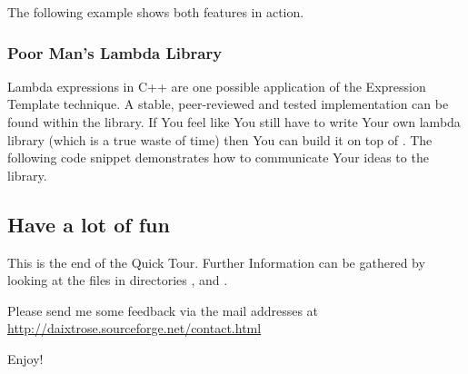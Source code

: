The following example shows both features in action.



\subsubsection{Poor Man's Lambda Library}

Lambda expressions in C++ are one possible application of the Expression
Template technique. A stable, peer-reviewed and tested implementation can be
found within the  library. If You feel like You still have to write
Your own lambda library (which is a true waste of time) then You can build it on
top of \Daixtrose. The following code snippet demonstrates how to communicate
Your ideas to the \Daixtrose library.








\subsection{Have a lot of fun}

This is the end of the Quick Tour.
Further Information can be gathered by looking at the files in directories
,  and .

Please send me some feedback via the mail addresses at \url{http://daixtrose.sourceforge.net/contact.html}

Enjoy!



